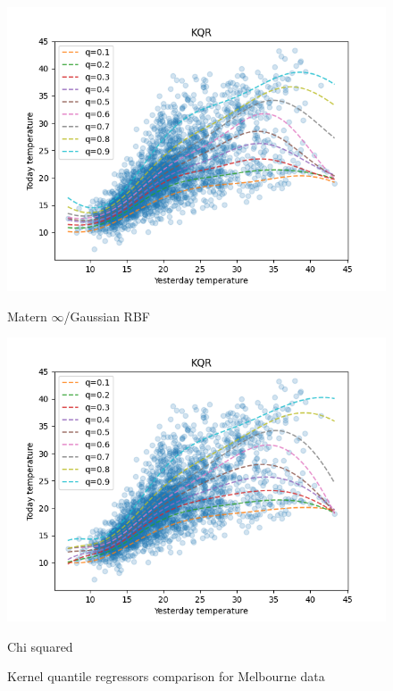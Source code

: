 \begin{figure}[!htp]
\begin{minipage}[b]{0.5\linewidth}
        \centering
        \includegraphics[width=1.0\textwidth]{images/melbourne_gaussian_rbf_kernel_quantile_regression.png}
        \caption{Matern $\infty$/Gaussian RBF} 
        \vspace{4ex}
      \end{minipage}%
      \begin{minipage}[b]{0.5\linewidth}
        \centering
        \includegraphics[width=1.0\textwidth]{images/melbourne_chi_squared_kernel_quantile_regression.png}
        \caption{Chi squared} 
        \vspace{4ex}
      \end{minipage} 
      \caption{Kernel quantile regressors comparison for Melbourne data}
      \label{fig:kernel quantile regressors comparison1} 
  \end{figure}

